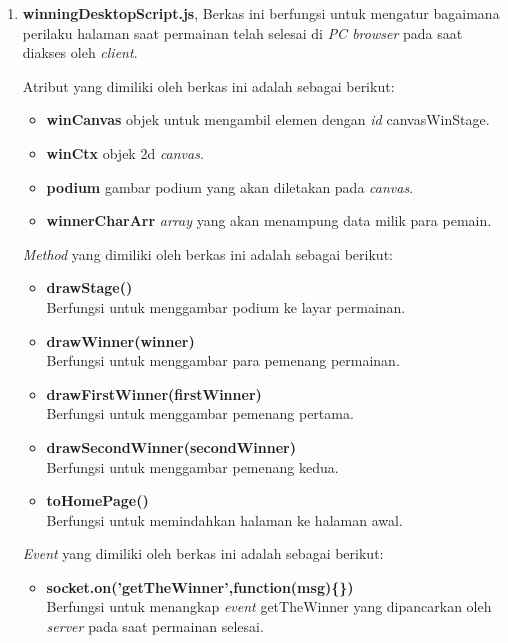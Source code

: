 \begin{enumerate}
\begin{enumerate}
\begin{enumerate}
\begin{itemize}
			\end{itemize}
			
			\item \textbf{winningDesktopScript.js}, Berkas ini berfungsi untuk mengatur bagaimana perilaku halaman saat permainan telah selesai di \textit{PC browser} pada saat diakses oleh \textit{client}.
			
			Atribut yang dimiliki oleh berkas ini adalah sebagai berikut:
			\begin{itemize}
				\item \textbf{winCanvas} objek untuk mengambil elemen dengan \textit{id} canvasWinStage.
				\item \textbf{winCtx} objek 2d \textit{canvas}.
				\item \textbf{podium} gambar podium yang akan diletakan pada \textit{canvas}.
				\item \textbf{winnerCharArr} \textit{array} yang akan menampung data milik para pemain.
			\end{itemize}
			
			\textit{Method} yang dimiliki oleh berkas ini adalah sebagai berikut:
			\begin{itemize}
				\item \textbf{drawStage()} \\
				Berfungsi untuk menggambar podium ke layar permainan.
				
				\item \textbf{drawWinner(winner)} \\
				Berfungsi untuk menggambar para pemenang permainan.
				
				\item \textbf{drawFirstWinner(firstWinner)} \\
				Berfungsi untuk menggambar pemenang pertama.
				
				\item \textbf{drawSecondWinner(secondWinner)} \\
				Berfungsi untuk menggambar pemenang kedua.
				
				\item \textbf{toHomePage()} \\
				Berfungsi untuk memindahkan halaman ke halaman awal.
			\end{itemize}
			
			\textit{Event} yang dimiliki oleh berkas ini adalah sebagai berikut:
			\begin{itemize}
				\item \textbf{socket.on('getTheWinner',function(msg)\{\})} \\
				Berfungsi untuk menangkap \textit{event} getTheWinner yang dipancarkan oleh \textit{server} pada saat permainan selesai.
				

\end{itemize}
\end{enumerate}
\end{enumerate}
\end{enumerate}

